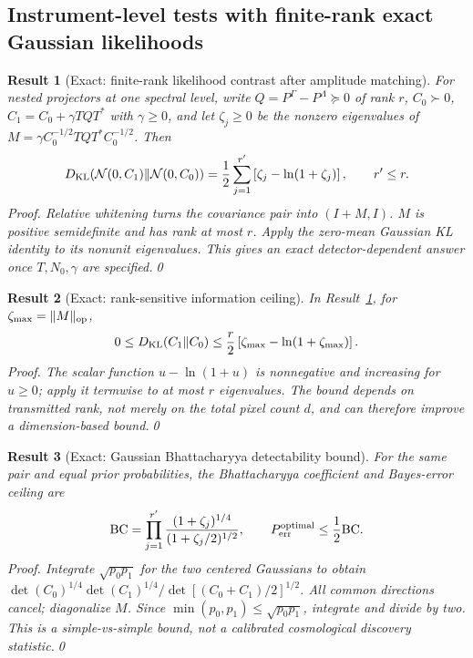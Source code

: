 \documentclass[aps,prd,onecolumn,notitlepage,groupedaddress,11pt]{revtex4-2}
\newtheorem{result}{Result}
\begin{document}
\subsection{Instrument-level tests with finite-rank exact Gaussian likelihoods}
\begin{result}[\textsf{Exact}: finite-rank likelihood contrast after amplitude matching]\label{new:147}
For nested projectors at one spectral level, write \(Q=P^\Gamma-P^\Lambda\succeq0\) of rank \(r\), \(C_0\succ0\), \(C_1=C_0+\gamma TQT^*\) with \(\gamma\ge0\), and let \(\zeta_j\ge0\) be the nonzero eigenvalues of \(M=\gamma C_0^{-1/2}TQT^*C_0^{-1/2}\). Then
\begin{equation}\label{new:eq147}
D_{\rm KL}(\mathcal N(0,C_1)\Vert\mathcal N(0,C_0))
=\frac12\sum_{j=1}^{r'}\left[\zeta_j-\ln(1+\zeta_j)\right],\qquad r'\le r.
\end{equation}
\textit{Proof.} Relative whitening turns the covariance pair into \((I+M,I)\). \(M\) is positive semidefinite and has rank at most \(r\). Apply the zero-mean Gaussian KL identity to its nonunit eigenvalues. This gives an \emph{exact} detector-dependent answer once \(T,N_0,\gamma\) are specified.\qed
\end{result}
\begin{result}[\textsf{Exact}: rank-sensitive information ceiling]\label{new:148}
In Result~\ref{new:147}, for \(\zeta_{\max}=\|M\|_{\rm op}\),
\begin{equation}\label{new:eq148}
0\le D_{\rm KL}(C_1\Vert C_0)\le
\frac r2\left[\zeta_{\max}-\ln(1+\zeta_{\max})\right].
\end{equation}
\textit{Proof.} The scalar function \(u-\ln(1+u)\) is nonnegative and increasing for \(u\ge0\); apply it termwise to at most \(r\) eigenvalues. The bound depends on \emph{transmitted rank}, not merely on the total pixel count \(d\), and can therefore improve a dimension-based bound.\qed
\end{result}
\begin{result}[\textsf{Exact}: Gaussian Bhattacharyya detectability bound]\label{new:149}
For the same pair and equal prior probabilities, the Bhattacharyya coefficient and Bayes-error ceiling are
\begin{equation}\label{new:eq149}
\mathrm{BC}=\prod_{j=1}^{r'}\frac{(1+\zeta_j)^{1/4}}{(1+\zeta_j/2)^{1/2}},\qquad
P_{\rm err}^{\rm optimal}\le\frac12\mathrm{BC}.
\end{equation}
\textit{Proof.} Integrate \(\sqrt{p_0p_1}\) for the two centered Gaussians to obtain \(\det(C_0)^{1/4}\det(C_1)^{1/4}/\det[(C_0+C_1)/2]^{1/2}\). All common directions cancel; diagonalize \(M\). Since \(\min(p_0,p_1)\le\sqrt{p_0p_1}\), integrate and divide by two. This is a simple-vs-simple bound, not a calibrated cosmological discovery statistic.\qed
\end{result}
\end{document}
